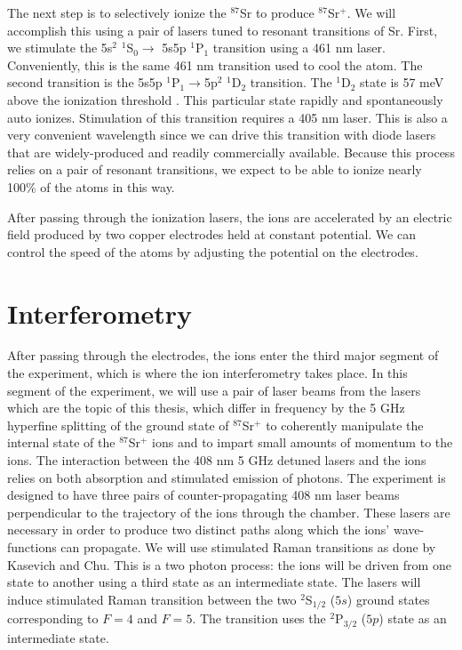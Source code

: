 The next step is to selectively ionize the $^{87}$Sr to produce $^{87}$Sr$^+$. We will accomplish this using a pair of lasers tuned to resonant transitions of Sr. First, we stimulate the 5s$^2$ $^1$S$_0 \rightarrow$ 5s5p $^1$P$_1$ transition using a 461 nm laser. Conveniently, this is the same 461 nm transition used to cool the atom. The second transition is the 5s5p $^1$P$_1\rightarrow$5p$^2$ $^1$D$_2$ transition. The $^1$D$_2$ state is 57 meV above the ionization threshold \cite{NSFprop}. This particular state rapidly and spontaneously auto ionizes. Stimulation of this transition requires a 405 nm laser. This is also a very convenient wavelength since we can drive this transition with diode lasers that are widely-produced and readily commercially available. Because this process relies on a pair of resonant transitions, we expect to be able to ionize nearly 100\% of the atoms in this way. 

After passing through the ionization lasers, the ions are accelerated by an electric field produced by two copper electrodes held at constant potential. We can control the speed of the atoms by adjusting the potential on the electrodes.%

\section{Interferometry}

After passing through the electrodes, the ions enter the third major segment of the experiment, which is where the ion interferometry takes place. In this segment of the experiment, we will use a pair of laser beams from the lasers which are the topic of this thesis, which differ in frequency by the 5 GHz hyperfine splitting of the ground state of $^{87}$Sr$^+$
to coherently manipulate the internal state of the $^{87}$Sr$^+$ ions and to impart small amounts of momentum to the ions. 
The interaction between the 408 nm 5 GHz detuned lasers and the ions relies on both absorption and stimulated emission of photons. The experiment is designed to have three pairs of counter-propagating 408 nm laser beams perpendicular to the trajectory of the ions through the chamber. 
These lasers are necessary in order to produce two distinct paths along which the ions' wave-functions can propagate. We will use stimulated Raman transitions as done by Kasevich and Chu\cite{kasevichChu1991}. This is a two photon process: %
the ions will be driven from one state to another using a third state as an intermediate state.
The lasers will induce stimulated Raman transition between the two $^2$S$_{1/2}$ ($5s$) ground states corresponding to $F=4$ and $F=5$. The transition uses the $^2$P$_{3/2}$ ($5p$) state as an intermediate state.

